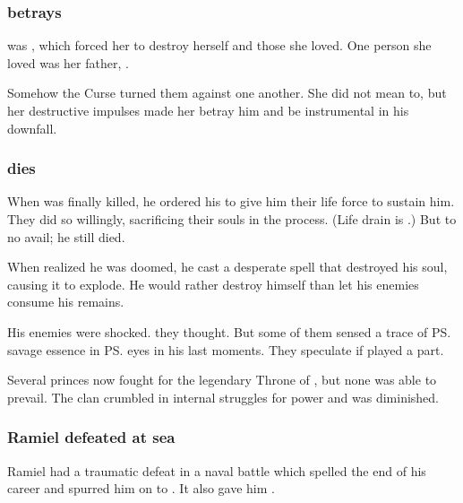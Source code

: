 \subsubsection{\Shiaraid{} betrays \Zachirah}
 was \NexagglachelsCurse, which forced her to destroy herself and those she loved. 
One person she loved was her father, \Zachirah. 

Somehow the Curse turned them against one another. 
She did not mean to, but her destructive impulses made her betray him and be instrumental in his downfall. 





\subsubsection{\Zachirah{} dies}
When \Zachirah{} was finally killed, he ordered his  to give him their life force to sustain him. 
They did so willingly, sacrificing their souls in the process. 
(Life drain is .)
But to no avail; he still died. 

When \Zachirah{} realized he was doomed, he cast a desperate spell that destroyed his soul, causing it to explode. 
He would rather destroy himself than let his enemies consume his remains. 

His enemies were shocked. 
 they thought. 
But some of them sensed a trace of \ps{\Nexagglachel} savage essence in \ps{\Zachirah} eyes in his last moments. 
They speculate if  played a part. 

Several princes now fought for the legendary Throne of \Mystraacht, but none was able to prevail. The clan crumbled in internal struggles for power and was diminished. 





\subsubsection{Ramiel defeated at sea}
Ramiel had a traumatic defeat in a naval battle which spelled the end of his career and spurred him on to . 
It also gave him . 


